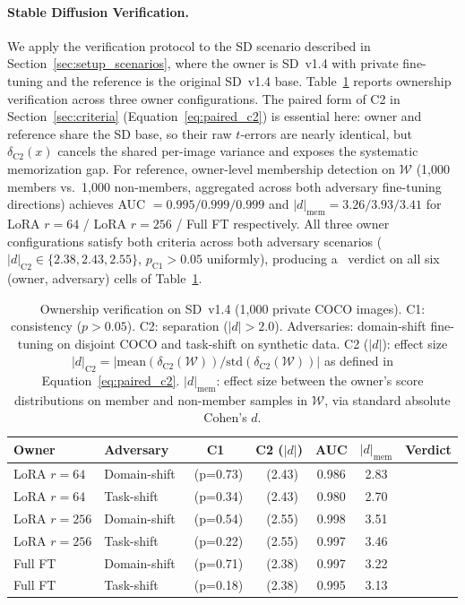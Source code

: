\documentclass{article}
\newcommand{\cmark}{\ding{51}}
\begin{document}
\paragraph{ Stable Diffusion Verification.}
We apply the verification protocol to the SD scenario described 
in Section~\ref{sec:setup_scenarios}, where the owner is SD~v1.4 
with private fine-tuning and the reference is the original SD~v1.4 
base. Table~\ref{tab:sd_verification} reports ownership verification 
across three owner configurations. The paired form of C2 in 
Section~\ref{sec:criteria} (Equation~\ref{eq:paired_c2}) is essential 
here: owner and reference share the SD base, so their raw $t$-errors 
are nearly identical, but $\delta_{\text{C2}}(x)$ cancels the shared 
per-image variance and exposes the systematic memorization gap. 
For reference, owner-level membership detection on $\mathcal{W}$ 
(1{,}000 members vs.\ 1{,}000 non-members, aggregated across both 
adversary fine-tuning directions) achieves AUC $= 0.995/0.999/0.999$ 
and $|d|_{\text{mem}} = 3.26/3.93/3.41$ for LoRA $r{=}64$ / LoRA 
$r{=}256$ / Full FT respectively. All three owner configurations 
satisfy both criteria across both adversary scenarios ($|d|_{\text{C2}} 
\in \{2.38, 2.43, 2.55\}$, $p_{\text{C1}} > 0.05$ uniformly), 
producing a \cmark\ verdict on all six (owner, adversary) cells of 
Table~\ref{tab:sd_verification}.

\begin{table}[t]
\caption{Ownership verification on SD~v1.4 (1{,}000 private COCO images).
C1: consistency ($p>0.05$).
C2: separation ($|d|>2.0$).
Adversaries: domain-shift fine-tuning on disjoint COCO and
task-shift on synthetic data.
C2 ($|d|$): effect size $|d|_{\text{C2}} = |\text{mean}(\delta_{\text{C2}}(\mathcal{W})) / \text{std}(\delta_{\text{C2}}(\mathcal{W}))|$ as defined in Equation~\ref{eq:paired_c2}.
$|d|_{\text{mem}}$: effect size between the owner's score
distributions on member and non-member samples in $\mathcal{W}$,
via standard absolute Cohen's $d$.}
\label{tab:sd_verification}
\centering
\small
\begin{tabular}{@{}llccccc@{}}
\toprule
Owner & Adversary & C1 & C2 ($|d|$) & AUC & $|d|_{\text{mem}}$ & Verdict \\
\midrule
LoRA $r\!=\!64$ & Domain-shift & \cmark~(p=0.73) & \cmark~(2.43) & 0.986 & 2.83 & \cmark \\
LoRA $r\!=\!64$ & Task-shift & \cmark~(p=0.34) & \cmark~(2.43) & 0.980 & 2.70 & \cmark \\
LoRA $r\!=\!256$ & Domain-shift & \cmark~(p=0.54) & \cmark~(2.55) & 0.998 & 3.51 & \cmark \\
LoRA $r\!=\!256$ & Task-shift & \cmark~(p=0.22) & \cmark~(2.55) & 0.997 & 3.46 & \cmark \\
Full FT & Domain-shift & \cmark~(p=0.71) & \cmark~(2.38) & 0.997 & 3.22 & \cmark \\
Full FT & Task-shift & \cmark~(p=0.18) & \cmark~(2.38) & 0.995 & 3.13 & \cmark \\
\bottomrule
\end{tabular}
\end{table}
\end{document}
